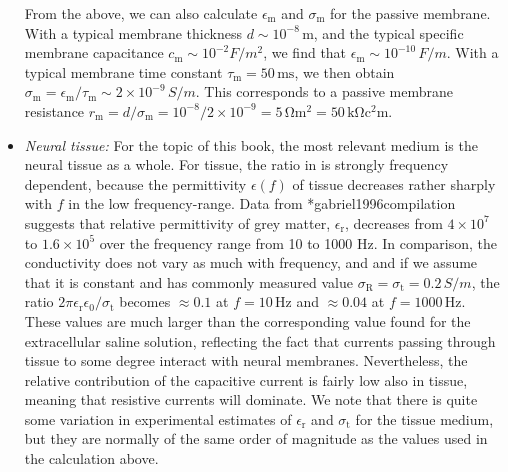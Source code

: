 \begin{itemize}
From the above, we can also calculate $\epsilon_\text{m}$ and $\sigma_\text{m}$ for the passive membrane. 
With a typical membrane thickness $d \sim 10^{-8} \, \si{\metre}$, 
and the typical specific membrane capacitance $c_\text{m} \sim 10^{-2} \si{F/m^2}$, 
we find that $\epsilon_\text{m} \sim 10^{-10} \, \si{F/m}$. 
With a typical membrane time constant $\tau_\text{m} = 50 \, \si{\milli\second}$, 
we then obtain $\sigma_\text{m} = \epsilon_\text{m}/\tau_\text{m} \sim 2\times10^{-9} \, \si{S/m}$. 
This corresponds to a passive membrane resistance 
$r_\text{m} = d/\sigma_\text{m} = 10^{-8}/2\times10^{-9} = 5\, \si{\ohm\square\metre} = 50 \, \si{\kilo\ohm\square\centi\metre}$.


\item \textit{Neural tissue:} For the topic of this book, the most relevant medium is the neural tissue as a whole. 
For tissue, the ratio in  is strongly frequency dependent, 
because the permittivity $\epsilon(f)$ of tissue decreases rather sharply with $f$ in the low frequency-range. 
Data from \citeasnoun**{gabriel1996compilation} suggests that relative permittivity of grey matter, 
$\epsilon_\text{r}$, decreases from $4\times10^7$ to $1.6\times 10^5$ over the frequency range from 10 to 1000 \si{\hertz}. 
In comparison, the conductivity does not vary as much with frequency, 
and and if we assume that it is constant and has commonly measured value 
$\sigma_\text{R} = \sigma_\text{t} = 0.2 \, \si{S/m}$, 
the ratio $2\pi\epsilon_\text{r}\epsilon_0/\sigma_\text{t}$ becomes $\approx 0.1$ at $f = 10 \, \si{\hertz}$ 
and $\approx 0.04 $ at $f = 1000 \, \si{\hertz}$. 
These values are much larger than the corresponding value found for the extracellular saline solution, 
reflecting the fact that currents passing through tissue to some degree interact with neural membranes. 
Nevertheless, the relative contribution of the capacitive current is fairly low also in tissue, 
meaning that resistive currents will dominate. 
We note that there is quite some variation in experimental estimates of  $\epsilon_\text{r}$ and $\sigma_\text{t}$ 
for the tissue medium, 
but they are normally of the same order of magnitude as the values used in the calculation above.
\end{itemize}

